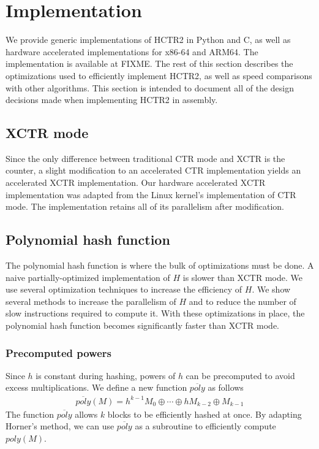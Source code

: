 \documentclass[hctr.tex]{subfiles}
\begin{document}
\section{Implementation}\label{implementation}
We provide generic implementations of HCTR2 in Python and C, as well as hardware accelerated implementations for x86-64 and ARM64. The implementation is available at {\color{red} FIXME}. The rest of this section describes the optimizations used to efficiently implement HCTR2, as well as speed comparisons with other algorithms. This section is intended to document all of the design decisions made when implementing HCTR2 in assembly.

\subsection{XCTR mode}
Since the only difference between traditional CTR mode and XCTR is the counter, a slight modification to an accelerated CTR implementation yields an accelerated XCTR implementation. Our hardware accelerated XCTR implementation was adapted from the Linux kernel's implementation of CTR mode. The implementation retains all of its parallelism after modification. 

\subsection{Polynomial hash function}
The polynomial hash function is where the bulk of optimizations must be done. A naive partially-optimized implementation of $H$ is slower than XCTR mode. We use several optimization techniques to increase the efficiency of $H$. We show several methods to increase the parallelism of $H$ and to reduce the number of slow instructions required to compute it. With these optimizations in place, the polynomial hash function becomes significantly faster than XCTR mode.

\subsubsection{Precomputed powers}
Since $h$ is constant during hashing, powers of $h$ can be precomputed to avoid excess multiplications. We define a new function $\overline{poly}$ as follows
\begin{align*}
       \overline{poly}(M) = h^{k-1}M_0 \oplus \cdots \oplus hM_{k-2} \oplus M_{k-1}
\end{align*}
The function $\overline{poly}$ allows $k$ blocks to be efficiently hashed at once. By adapting Horner's method, we can use $\overline{poly}$ as a subroutine to efficiently compute $poly(M)$.
\end{document}
